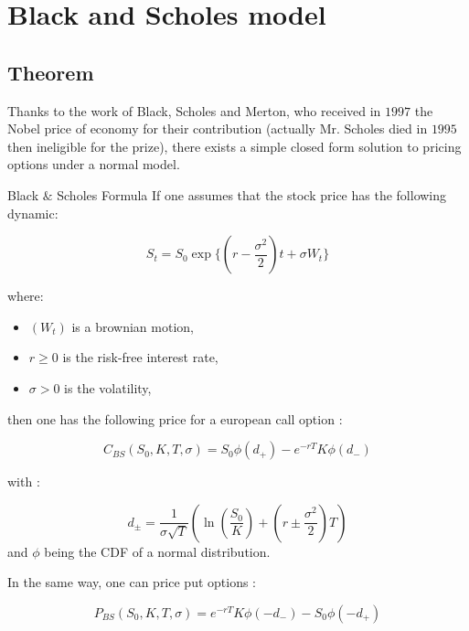 \chapter{Black and Scholes model}
\label{BSformula}
\section{Theorem}

Thanks to the work of Black, Scholes and Merton, who received in $1997$ the Nobel price of economy for their contribution (actually Mr. Scholes died in $1995$ then ineligible for the prize), there exists a simple closed form solution to pricing options under a normal model.  

\begin{theoreme}[label = thrm:BSformula]{Black $\&$ Scholes Formula}
If one assumes that the stock price has the following dynamic:

$$S_t = S_0 \exp \{ (r - \frac {\sigma^2} 2) t + \sigma W_t \} $$

where:
\begin{itemize}
\item $(W_t)$ is a brownian motion, 
\item $r \geq 0$ is the risk-free interest rate,  
\item $\sigma > 0$ is the volatility, 
\end{itemize}

then one has the following price for a european call option :

$$ C_{BS}( S_0, K, T, \sigma ) = S_0 \phi ( d_+ ) - e^{-r T } K  \phi( d_- ) $$ 

with : 

$$ d_{\pm} = \frac{1}{\sigma \sqrt{T}  } \left ( \ln(\frac{S_0}{K}) + \left ( r \pm \frac{\sigma^2}{2} \right ) T \right )$$
and $\phi$ being the CDF of a normal distribution.

In the same way, one can price put options : 

$$P_{BS}( S_0, K, T, \sigma ) =  e^{-rT} K \phi(-d_-) - S_0 \phi(-d_+) $$

\end{theoreme}



